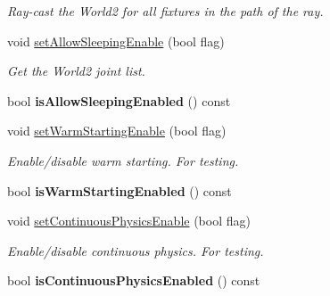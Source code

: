 \begin{DoxyCompactItemize}
\begin{DoxyCompactList}\small\item\em Ray-\/cast the World2 for all fixtures in the path of the ray. \end{DoxyCompactList}\item 
void \hyperlink{class_i_dream_sky_1_1_physics3_1_1_world_aed4938e91123fe450fcdb81af7ca23ec}{set\+Allow\+Sleeping\+Enable} (bool flag)
\begin{DoxyCompactList}\small\item\em Get the World2 joint list. \end{DoxyCompactList}\item 
bool {\bfseries is\+Allow\+Sleeping\+Enabled} () const \hypertarget{class_i_dream_sky_1_1_physics3_1_1_world_a46b1e9ef60205ecb48634525c598bf6e}{}\label{class_i_dream_sky_1_1_physics3_1_1_world_a46b1e9ef60205ecb48634525c598bf6e}

\item 
void \hyperlink{class_i_dream_sky_1_1_physics3_1_1_world_af7507c9299f0ff99b45f61d35f1eb1ca}{set\+Warm\+Starting\+Enable} (bool flag)\hypertarget{class_i_dream_sky_1_1_physics3_1_1_world_af7507c9299f0ff99b45f61d35f1eb1ca}{}\label{class_i_dream_sky_1_1_physics3_1_1_world_af7507c9299f0ff99b45f61d35f1eb1ca}

\begin{DoxyCompactList}\small\item\em Enable/disable warm starting. For testing. \end{DoxyCompactList}\item 
bool {\bfseries is\+Warm\+Starting\+Enabled} () const \hypertarget{class_i_dream_sky_1_1_physics3_1_1_world_a42fdb76e78b95804890ad84170f14d99}{}\label{class_i_dream_sky_1_1_physics3_1_1_world_a42fdb76e78b95804890ad84170f14d99}

\item 
void \hyperlink{class_i_dream_sky_1_1_physics3_1_1_world_a885ead1462b8171eb24d515da4d886a1}{set\+Continuous\+Physics\+Enable} (bool flag)\hypertarget{class_i_dream_sky_1_1_physics3_1_1_world_a885ead1462b8171eb24d515da4d886a1}{}\label{class_i_dream_sky_1_1_physics3_1_1_world_a885ead1462b8171eb24d515da4d886a1}

\begin{DoxyCompactList}\small\item\em Enable/disable continuous physics. For testing. \end{DoxyCompactList}\item 
bool {\bfseries is\+Continuous\+Physics\+Enabled} () const \hypertarget{class_i_dream_sky_1_1_physics3_1_1_world_ad380b3bd17d1e3f84eec5e1a17f30bb2}{}\label{class_i_dream_sky_1_1_physics3_1_1_world_ad380b3bd17d1e3f84eec5e1a17f30bb2}


\end{DoxyCompactItemize}
